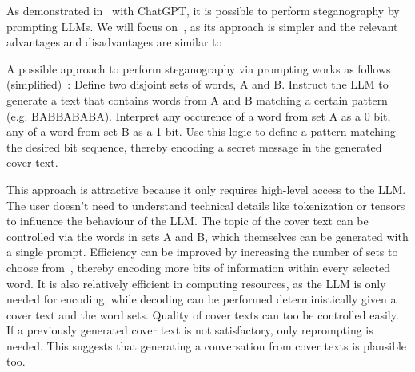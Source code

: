 As demonstrated in~\cite{steinebachNaturalLanguageSteganography2024,wuPromptingSteganographyNew2024} with ChatGPT, it is possible to perform steganography by prompting \glspl{LLM}. We will focus on~\cite{steinebachNaturalLanguageSteganography2024}, as its approach is simpler and the relevant advantages and disadvantages are similar to~\cite{wuPromptingSteganographyNew2024}.

A possible approach to perform steganography via prompting works as follows (simplified)~\cite{steinebachNaturalLanguageSteganography2024}: Define two disjoint sets of words, A and B. Instruct the LLM to generate a text that contains words from A and B matching a certain pattern (e.g. BABBABABA). Interpret any occurence of a word from set A as a 0 bit, any of a word from set B as a 1 bit. Use this logic to define a pattern matching the desired bit sequence, thereby encoding a secret message in the generated cover text.

This approach is attractive because it only requires high-level access to the \gls{LLM}. The user doesn't need to understand technical details like tokenization or tensors to influence the behaviour of the \gls{LLM}. The topic of the cover text can be controlled via the words in sets A and B, which themselves can be generated with a single prompt. Efficiency can be improved by increasing the number of sets to choose from~\cite{steinebachNaturalLanguageSteganography2024}, thereby encoding more bits of information within every selected word. It is also relatively efficient in computing resources, as the \gls{LLM} is only needed for encoding, while decoding can be performed deterministically given a cover text and the word sets. Quality of cover texts can too be controlled easily. If a previously generated cover text is not satisfactory, only reprompting is needed. This suggests that generating a conversation from cover texts is plausible too.

